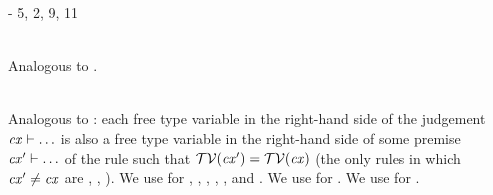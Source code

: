 \begin{bycase}
\Case{\Revar}
\begin{derivation}
\step{\vdecO\in\cx}{\premof{\Revar}}
\step{\cxwf{\cx}}{\premof{\Revar}}
\steP
{\cxtvarO
 \ftvar{\typ}}
\end{derivation}

\Case{\Reop}
\begin{derivation}
     {}
\step{\odecO\in\cx}{\premof{\Reop}}
\step{\cxwf{\cx}}{\premof{\Reop}}
\steP
{\cxtvarO
 \ftvar{\odecO}
 \linK{\supseteq}
 \ftvar{\typ}-\tvarS}
\step{\cxtvarO\supseteq\ftvar{\opO}\cup\ftvar{\tsbslash{\typ}{\tvarS}{\typS}}}
     {5, 2, 9, 11}
\end{derivation}

\Case{\Reabs}
\begin{derivation}
\steP{\ftvar{\absO}=\ftvar{\typ}\cup\ftvar{\expr}}
\end{derivation}

\Case{\Rthax}\\
Analogous to \Reop.

\Case{\Rthbool}
      {}

\Case{\restrules}\\
Analogous to \Rtinst: each free type variable in the right-hand side of the
judgement $\mathit{cx}\vdash\ldots$ is also a free type variable in the right-hand side
of some premise $\mathit{cx}'\vdash\ldots$ of the rule such that
$\mathcal{TV}(\mathit{cx}')=\mathcal{TV}(\mathit{cx})$ (the only rules in which $\mathit{cx}'\neq\mathit{cx}$ are \Reif,
\Rthifsbs, \Rthif). We use  for \Rstrefl, \Rstrec,
\Redesc, \Rthext, \Rthrec, and \Rthprojsub. We use
 for \Reabsalpha. We use
 for \Rthabs.

\end{bycase}




